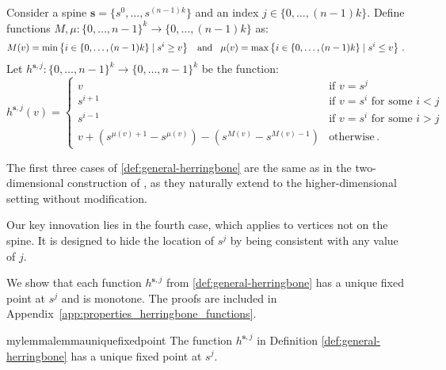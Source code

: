 \documentclass[11pt]{article}
\begin{document}
\begin{definition}
    \label{def:general-herringbone}
    Consider a spine $\mathbf{s} = \{s^0, \ldots, s^{(n-1)k}\}$ and an index  $j \in \{0, \ldots, (n-1)k\}$.
Define functions $M, \mu : \{0, \ldots, n-1\}^k \to \{0, \ldots, (n-1)k\}$ as: 
    \begin{align}
        M(v) = \min \left\{i \in \{0, \ldots, (n-1)k\} \mid s^i \geq v \right\} \; \; \;   \mbox{and} \; \; \;    
        \mu(v) = \max \left\{ i  \in \{0, \ldots, (n-1)k\} \mid  s^i \leq v \right\}\,.  \notag 
    \end{align}
    Let $h^{\mathbf{s}, j} : \{0, \ldots, n-1\}^k \to \{0, \ldots, n-1\}^k$  be the function:
    \begin{equation}
        h^{\mathbf{s}, j}(v) = \begin{cases}
            v & \text{if } v = s^j \\
            s^{i+1} & \text{if } v = s^i \text{ for some } i < j \\
            s^{i-1} & \text{if } v = s^i \text{ for some } i > j \\
            v + (s^{\mu(v)+1} - s^{\mu(v)}) - (s^{M(v)} - s^{M(v)-1}) & \text{otherwise} \,.
        \end{cases}
    \end{equation}
\end{definition}

The first three cases of \cref{def:general-herringbone} are the same as in the two-dimensional construction of \cite{etessami2019tarski}, as they naturally extend to the higher-dimensional setting without modification. 

Our key innovation lies in the fourth case, which applies to vertices not on the spine. It is designed to hide the location of $s^j$ by being consistent with any value of $j$.

We show that each function $h^{\mathbf{s}, j} $ from  \cref{def:general-herringbone} has a unique fixed point at $s^j$ and is monotone. The proofs are included in Appendix~\ref{app:properties_herringbone_functions}.
\begin{restatable}{mylemma}{lemmauniquefixedpoint}
\label{lem:h-unique-fixedpoint}
    The function $h^{\mathbf{s}, j}$ in Definition \ref{def:general-herringbone} has a unique fixed point at $s^j$.
\end{restatable}
\end{document}
